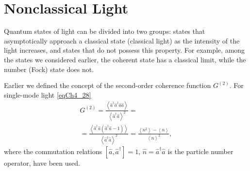 \chapter{Nonclassical Light}
\label{chNonClass}
Quantum states of light can be divided into two groups: states
that asymptotically approach
a classical state (classical light) as the intensity of the light increases, and states that do not
possess this property. For example, among the states we considered earlier,
the coherent state has a classical limit, while the number (Fock) state does not.

Earlier we defined the concept of the second-order coherence function 
$G^{(2)}$. For single-mode light \eqref{eqCh4_28}
\begin{eqnarray}
G^{(2)} = \frac{\left<\hat{a}^{\dag}\hat{a}^{\dag}\hat{a}\hat{a}\right>}
{\left<\hat{a}^{\dag}\hat{a}\right>^2} = 
\nonumber \\
= 
\frac{\left<\hat{a}^{\dag}\hat{a}\left(\hat{a}^{\dag}\hat{a} - 1\right)\right>}
{\left<\hat{a}^{\dag}\hat{a}\right>^2} = 
\frac{\left<n^2\right> - \left<n\right>}{\left<n\right>^2},
\label{eqPart3_Nonclass_Nonclass1}
\end{eqnarray}
where the commutation relations
$\left[\hat{a}, \hat{a}^{\dag}\right] = 1$, 
$\hat{n} = \hat{a}^{\dag}\hat{a}$ is the particle number operator, have been used.

